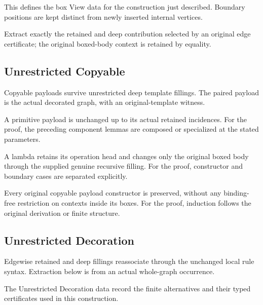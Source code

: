 This defines the box View data for the construction just described. Boundary positions are kept distinct from newly inserted internal vertices.
\par{}

Extract exactly the retained and deep contribution selected by an original edge certificate; the original boxed-body context is retained by equality.
\par{}

\subsection{Unrestricted Copyable}
Copyable payloads survive unrestricted deep template fillings. The paired payload is the actual decorated graph, with an original-template witness.

A primitive payload is unchanged up to its actual retained incidences.
For the proof, the preceding component lemmas are composed or specialized at the stated parameters.
\par{}

A lambda retains its operation head and changes only the original boxed body through the supplied genuine recursive filling.
For the proof, constructor and boundary cases are separated explicitly.
\par{}

Every original copyable payload constructor is preserved, without any binding-free restriction on contexts inside its boxes.
For the proof, induction follows the original derivation or finite structure.
\par{}

\subsection{Unrestricted Decoration}
Edgewise retained and deep fillings reassociate through the unchanged local rule syntax. Extraction below is from an actual whole-graph occurrence.

The Unrestricted Decoration data record the finite alternatives and their typed certificates used in this construction.
\par{}

